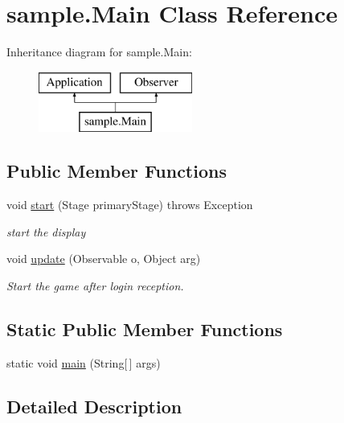 \hypertarget{classsample_1_1_main}{}\section{sample.\+Main Class Reference}
\label{classsample_1_1_main}
Inheritance diagram for sample.\+Main\+:\begin{figure}[H]
\begin{center}
\leavevmode
\includegraphics[height=2.000000cm]{classsample_1_1_main}
\end{center}
\end{figure}
\subsection*{Public Member Functions}
\begin{DoxyCompactItemize}
\item 
void \hyperlink{classsample_1_1_main_a4201e12604eb49ee4c0968db7aa3a876}{start} (Stage primary\+Stage)  throws Exception
\begin{DoxyCompactList}\small\item\em start the display \end{DoxyCompactList}\item 
void \hyperlink{classsample_1_1_main_a94132284ede73bbe43d239edc379351a}{update} (Observable o, Object arg)
\begin{DoxyCompactList}\small\item\em Start the game after login reception. \end{DoxyCompactList}\end{DoxyCompactItemize}
\subsection*{Static Public Member Functions}
\begin{DoxyCompactItemize}
\item 
static void \hyperlink{classsample_1_1_main_ab70e98057c0f40b833a38ea10a74eceb}{main} (String\mbox{[}$\,$\mbox{]} args)
\end{DoxyCompactItemize}


\subsection{Detailed Description}


